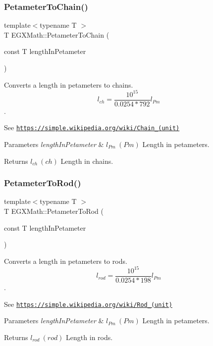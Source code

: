 \subsubsection{\texorpdfstring{Petameter\+To\+Chain()}{PetameterToChain()}}
{\footnotesize\ttfamily template$<$typename T $>$ \\
T E\+G\+X\+Math\+::\+Petameter\+To\+Chain (\begin{DoxyParamCaption}\item[{const T}]{length\+In\+Petameter }\end{DoxyParamCaption})}



Converts a length in petameters to chains. \[ l_{ch}= \frac{10^{15}}{0.0254 * 792} l_{Pm} \]. 

See \href{https://simple.wikipedia.org/wiki/Chain_(unit)}{\tt https\+://simple.\+wikipedia.\+org/wiki/\+Chain\+\_\+(unit)} 
\begin{DoxyParams}{Parameters}
{\em length\+In\+Petameter} & $ l_{Pm}\ (Pm)$ Length in petameters. \\
\hline
\end{DoxyParams}
\begin{DoxyReturn}{Returns}
$ l_{ch}\ (ch)$ Length in chains. 
\end{DoxyReturn}
\mbox{\label{group___e_g_x_math-_conversions-_length_conversions-_s_i-_petameter-_surveyors_gae7cef029bdb3e7ace9aa08e0183cc202}} 
\subsubsection{\texorpdfstring{Petameter\+To\+Rod()}{PetameterToRod()}}
{\footnotesize\ttfamily template$<$typename T $>$ \\
T E\+G\+X\+Math\+::\+Petameter\+To\+Rod (\begin{DoxyParamCaption}\item[{const T}]{length\+In\+Petameter }\end{DoxyParamCaption})}



Converts a length in petameters to rods. \[ l_{rod}= \frac{10^{15}}{0.0254 * 198} l_{Pm} \]. 

See \href{https://simple.wikipedia.org/wiki/Rod_(unit)}{\tt https\+://simple.\+wikipedia.\+org/wiki/\+Rod\+\_\+(unit)} 
\begin{DoxyParams}{Parameters}
{\em length\+In\+Petameter} & $ l_{Pm}\ (Pm)$ Length in petameters. \\
\hline
\end{DoxyParams}
\begin{DoxyReturn}{Returns}
$ l_{rod}\ (rod)$ Length in rods. 
\end{DoxyReturn}
